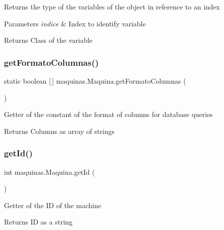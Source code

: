 Returns the type of the variables of the object in reference to an index


\begin{DoxyParams}{Parameters}
{\em indice} & Index to identify variable \\
\hline
\end{DoxyParams}
\begin{DoxyReturn}{Returns}
Class of the variable 
\end{DoxyReturn}
\mbox{\label{classmaquinas_1_1_maquina_a8bb7dae09526ff44e0e905be4305382c}} 
\subsubsection{\texorpdfstring{get\+Formato\+Columnas()}{getFormatoColumnas()}}
{\footnotesize\ttfamily static boolean \mbox{[}$\,$\mbox{]} maquinas.\+Maquina.\+get\+Formato\+Columnas (\begin{DoxyParamCaption}{ }\end{DoxyParamCaption})\hspace{0.3cm}{\ttfamily [static]}}

Getter of the constant of the format of columns for database queries

\begin{DoxyReturn}{Returns}
Columns as array of strings 
\end{DoxyReturn}
\mbox{\label{classmaquinas_1_1_maquina_abaf73d4cd4f7608d86d303ff20046019}} 
\subsubsection{\texorpdfstring{get\+Id()}{getId()}}
{\footnotesize\ttfamily int maquinas.\+Maquina.\+get\+Id (\begin{DoxyParamCaption}{ }\end{DoxyParamCaption})}

Getter of the ID of the machine

\begin{DoxyReturn}{Returns}
ID as a string 
\end{DoxyReturn}
\mbox{\label{classmaquinas_1_1_maquina_a47e430c44c10450125499adaeb26531c}} 
